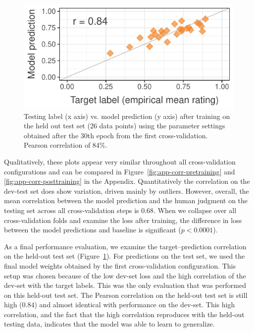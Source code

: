 \documentclass[11pt,a4paper]{article}
\begin{document}
\begin{figure}
  \includegraphics[width=\linewidth]{graphs/test-corr.pdf}
  \caption{Testing label (x axis) vs. model prediction (y axis) after training on the held out test set (26 data points) using the parameter settings obtained after the 30th epoch from the first cross-validation. Pearson correlation of 84\%.}
  \label{fig:test-corr}
\end{figure}

Qualitatively, these plots appear very similar throughout all cross-validation configurations and can be compared in Figure~\ref{fig:app-corr-pretraining} and \ref{fig:app-corr-posttraining} in the Appendix. Quantitatively the correlation on the dev-test set does show variation, driven mainly by outliers. However, overall, the mean correlation between the model prediction and the human judgment on the testing set across all cross-validation steps is $0.68$. When we collapse over all cross-validation folds and examine the loss after training, the difference in loss between the model predictions and baseline is significant ($p<0.0001$).

As a final performance evaluation, we examine the target--prediction correlation on the held-out test set (Figure~\ref{fig:test-corr}). For predictions on the test set, we used the final model weights obtained by the first cross-validation configuration. This setup was chosen because of the low dev-set loss and the high correlation of the dev-set with the target labels. This was the only evaluation that was performed on this held-out test set. The Pearson correlation on the held-out test set is still high ($0.84$) and almost identical with performance on the dev-set. This high correlation, and the fact that the high correlation reproduces with the held-out testing data, indicates that the model was able to learn to generalize.
\end{document}
